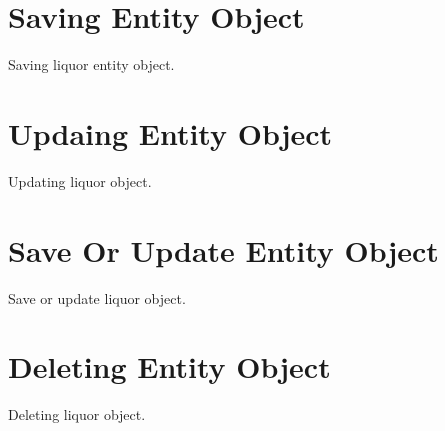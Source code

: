 	


\section{Saving Entity Object}
Saving liquor entity object.

	


\section{Updaing Entity Object}
Updating liquor object.

	


\section{Save Or Update Entity Object}
Save or update liquor object.

	



\section{Deleting Entity Object}
Deleting liquor object.

	



